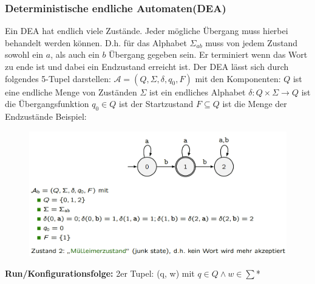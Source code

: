 \documentclass[12pt,a4paper]{article}
\begin{document}
	\subsubsection{Deterministische endliche Automaten(DEA)}
	Ein DEA hat endlich viele Zustände. Jeder mögliche Übergang muss hierbei behandelt werden können. D.h. für das Alphabet $\varSigma_{ab}$ muss von jedem Zustand sowohl ein $a$, als auch ein $b$ Übergang gegeben sein. Er terminiert wenn das Wort zu ende ist und dabei ein Endzustand erreicht ist.\newline
	\noindent Der DEA lässt sich durch folgendes 5-Tupel darstellen:\newline
	$\mathcal{A} = (Q, \varSigma, \delta, q_0, F)$ mit den Komponenten:\newline
	$Q$ ist eine endliche Menge von Zuständen\newline
	$\varSigma$ ist ein endliches Alphabet\newline
	$\delta: Q \times \varSigma \rightarrow Q$ ist die Übergangsfunktion\newline
	$q_0 \in Q$ ist der Startzustand\newline
	$F \subseteq Q$ ist die Menge der Endzustände\newline
	\newline
	Beispiel:\newline
	\begin{center}
		\begin{figure}[!h]
			\includegraphics[width=\textwidth]{Bilder/DEA_Beispiel.PNG}
		\end{figure}
	\end{center}
	\textbf{Run/Konfigurationsfolge: } 2er Tupel: (q, w) mit $q \in Q \wedge w \in \sum$*
\end{document}
